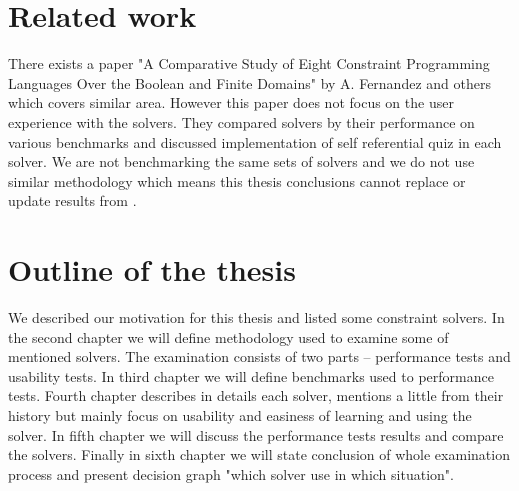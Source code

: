 \section{Related work}
There exists a paper "A Comparative Study of Eight Constraint Programming Languages 
Over the Boolean and Finite Domains" by A. Fernandez and others \cite{fernandez00} 
which covers similar area. However this paper does not focus on the user experience 
with the solvers. They compared solvers by their performance on various benchmarks 
and discussed implementation of self referential quiz in each solver. We are not 
benchmarking the same sets of solvers and we do not use similar methodology which 
means this thesis conclusions cannot replace or update results from \cite{fernandez00}.

\section{Outline of the thesis}
We described our motivation for this thesis and listed some constraint solvers. 
In the second chapter we will define methodology used to examine some of mentioned 
solvers. The examination consists of two parts -- performance tests and usability 
tests. In third chapter we will define benchmarks used to performance tests. 
Fourth chapter describes in details each solver, mentions a little from their 
history but mainly focus on usability and easiness of learning and using the solver. 
In fifth chapter we will discuss the performance tests results and compare the solvers. 
Finally in sixth chapter we will state conclusion of whole examination process 
and present decision graph "which solver use in which situation".
